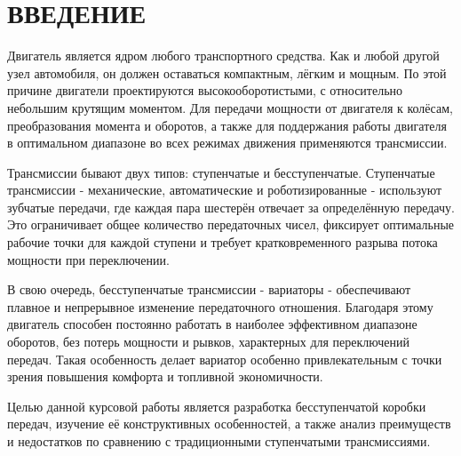 \chapter*{ВВЕДЕНИЕ}

Двигатель является ядром любого транспортного средства. Как и любой другой узел автомобиля, он должен оставаться компактным, лёгким и мощным. По этой причине двигатели проектируются высокооборотистыми, с относительно небольшим крутящим моментом. Для передачи мощности от двигателя к колёсам, преобразования момента и оборотов, а также для поддержания работы двигателя в оптимальном диапазоне во всех режимах движения применяются трансмиссии.

Трансмиссии бывают двух типов: ступенчатые и бесступенчатые. Ступенчатые трансмиссии - механические, автоматические и роботизированные - используют зубчатые передачи, где каждая пара шестерён отвечает за определённую передачу. Это ограничивает общее количество передаточных чисел, фиксирует оптимальные рабочие точки для каждой ступени и требует кратковременного разрыва потока мощности при переключении.

В свою очередь, бесступенчатые трансмиссии - вариаторы - обеспечивают плавное и непрерывное изменение передаточного отношения. Благодаря этому двигатель способен постоянно работать в наиболее эффективном диапазоне оборотов, без потерь мощности и рывков, характерных для переключений передач. Такая особенность делает вариатор особенно привлекательным с точки зрения повышения комфорта и топливной экономичности.

Целью данной курсовой работы является разработка бесступенчатой коробки передач, изучение её конструктивных особенностей, а также анализ преимуществ и недостатков по сравнению с традиционными ступенчатыми трансмиссиями.